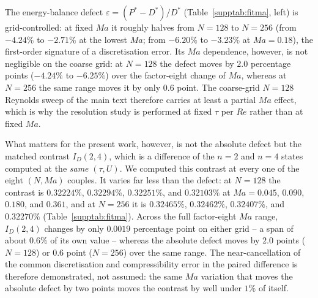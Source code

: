 The energy-balance defect $\varepsilon=(P^*-D^*)/D^*$ (Table~\ref{supptab:fitma}, left) is grid-controlled: at fixed $Ma$ it roughly halves from $N=128$ to $N=256$ (from $-4.24\%$ to $-2.71\%$ at the lowest $Ma$; from $-6.20\%$ to $-3.23\%$ at $Ma=0.18$), the first-order signature of a discretisation error. Its $Ma$ dependence, however, is not negligible on the coarse grid: at $N=128$ the defect moves by $2.0$ percentage points ($-4.24\%$ to $-6.25\%$) over the factor-eight change of $Ma$, whereas at $N=256$ the same range moves it by only $0.6$ point. The coarse-grid $N=128$ Reynolds sweep of the main text therefore carries at least a partial $Ma$ effect, which is why the resolution study is performed at fixed $\tau$ per $Re$ rather than at fixed $Ma$.

What matters for the present work, however, is not the absolute defect but the matched contrast $I_D(2,4)$, which is a difference of the $n=2$ and $n=4$ states computed at the \emph{same} $(\tau,U)$. We computed this contrast at every one of the eight $(N,Ma)$ couples. It varies far less than the defect: at $N=128$ the contrast is $0.32224\%$, $0.32294\%$, $0.32251\%$, and $0.32103\%$ at $Ma=0.045$, $0.090$, $0.180$, and $0.361$, and at $N=256$ it is $0.32465\%$, $0.32462\%$, $0.32407\%$, and $0.32270\%$ (Table~\ref{supptab:fitma}). Across the full factor-eight $Ma$ range, $I_D(2,4)$ changes by only $0.0019$ percentage point on either grid -- a span of about $0.6\%$ of its own value -- whereas the absolute defect moves by $2.0$ points ($N=128$) or $0.6$ point ($N=256$) over the same range. The near-cancellation of the common discretisation and compressibility error in the paired difference is therefore demonstrated, not assumed: the same $Ma$ variation that moves the absolute defect by two points moves the contrast by well under $1\%$ of itself.

